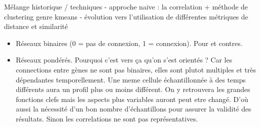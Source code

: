 Mélange historique / techniques
- approche naive : la correlation + méthode de clustering genre kmeans
- évolution vers l'utilisation de différentes métriques de distance et similarité








\begin{itemize}
    \item Réseaux binaires (0 = pas de connexion, 1 = connexion). Pour et contres.
    \item Réseaux pondérés. Pourquoi c'est vers ça qu'on s'est orientés ? Car les connections entre gènes ne sont pas binaires, elles sont plutot multiples et très dépendantes temporellement. Une meme cellule échantillonnée à des temps différents aura un profil plus ou moins différent. On y retrouvera les grandes fonctions clefs mais les aspects plus variables auront peut etre changé. D'où aussi la nécessité d'un bon nombre d'échantillons pour assurer la validité des résultats. Sinon les correlations ne sont pas représentatives.
\end{itemize}

